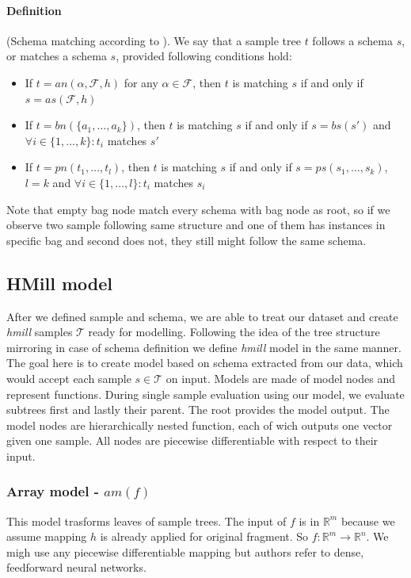 \paragraph{Definition} (Schema matching according to \cite{Mandlik2020}). We say that a sample tree $t$ follows a schema $s$, or matches a schema $s$, provided following conditions hold:
\begin{itemize}
    \item If $t=an(\alpha,\mathcal{F},h)$ for any $\alpha\in\mathcal{F}$, then $t$ is matching $s$ if and only if $s=as(\mathcal{F},h)$
    \item If $t=bn(\{a_1,\dots,a_k\})$, then $t$ is matching $s$ if and only if $s=bs(s')$ and $\forall i\in\{1,\dots,k\}:t_i$ matches $s'$
    \item If $t=pn(t_1,\dots,t_l)$, then $t$ is matching $s$ if and only if $s=ps(s_1,\dots,s_k)$,$l=k$ and $\forall i\in\{1,\dots,l\}:t_i$ matches $s_i$
\end{itemize}

Note that empty bag node match every schema with bag node as root, so if we observe two sample following same structure and one of them has instances in specific bag and second does not, they still might follow the same schema.
\subsection{HMill model}
After we defined sample and schema, we are able to treat our dataset and create \emph{hmill} samples $\mathcal{T}$ ready for modelling. Following the idea of the tree structure mirroring in case of schema definition we define \emph{hmill} model in the same manner. The goal here is to create model based on schema extracted from our data, which would accept each sample $s\in\mathcal{T}$ on input. Models are made of model nodes and represent functions. During single sample evaluation using our model, we evaluate subtrees first and lastly their parent. The root provides the model output. The model nodes are hierarchically nested function, each of wich outputs one vector given one sample. All nodes are piecewise differentiable with respect to their input.

\subsubsection{Array model - $am(f)$}
This model trasforms leaves of sample trees. The input of $f$ is in $\mathbb{R}^{m}$ because we assume mapping $h$ is already applied for original fragment. So $f:\mathbb{R}^m\rightarrow\mathbb{R}^n$. We migh use any piecewise differentiable mapping but authors refer to dense, feedforward neural networks.

